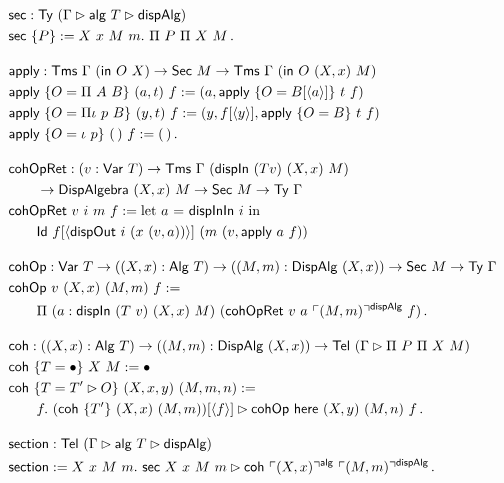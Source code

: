 \begin{fleqn}
\begin{align*}
&\mta{sec} : \Ty\ (\Gamma \rhd \mta{alg}\ T \rhd \mta{dispAlg})  \\
&\mta{sec}\ \{P\} := X\ x\ M\ m.\ \Pi\ P\ \Pi\ X\ M \,. \\[1em]
&\mta{apply} : \mta{Tms}\ \Gamma\ (\mta{in}\ O\ X) \to \mta{Sec}\ M \to \Tms\ \Gamma\ (\mta{in}\ O\ (X, x)\ M) \\
&\mta{apply}\ \{O = \Pi\ A\ B\}\ (a, t)\ f := (a, \mta{apply}\ \{O = B[\Msub a]\}\ t\ f) \\
&\mta{apply}\ \{O = \Pi\iota\ p\ B\}\ (y, t)\ f := (y, f[\Msub y], \mta{apply}\ \{O = B\}\ t\ f) \\
&\mta{apply}\ \{O = \iota\ p\}\ (\,)\ f := (\,) \,. \\[1em]
&\mta{cohOpRet} : (v : \mta{Var}\ T) \to \Tms\ \Gamma\ (\mta{dispIn}\ (T v)\ (X, x)\ M) \\ &\qquad \to \mta{DispAlgebra}\ (X, x)\ M \to \mta{Sec}\ M \to \Ty\ \Gamma \\
&\mta{cohOpRet}\ v\ i\ m\ f := \text{let $a$ = $\mta{dispInIn}\ i$ in } \\ & \qquad \mta{Id}\ f[\Msub{\mta{dispOut}\ i\ (x\ (v, a))}]\ (m\ (v, \mta{apply}\ a\ f)) \\[1em]
&\mta{cohOp} : \mta{Var}\ T \to ((X, x) : \mta{Alg}\ T) \to ((M, m) : \mta{DispAlg}\ (X, x)) \to \mta{Sec}\ M \to \Ty\ \Gamma \\
&\mta{cohOp}\ v\ (X, x)\ (M, m)\ f := \\ & \qquad \Pi\ (a : \mta{dispIn}\ (T\ v)\ (X, x)\ M)\ (\mta{cohOpRet}\ v\ a\ \emb{(M, m)}^{\mta{dispAlg}}\ f)\, . \\[1em]
&\mta{coh} : ((X, x) : \mta{Alg}\ T) \to ((M, m) : \mta{DispAlg}\ (X, x)) \to \Tel\ (\Gamma \rhd \Pi\ P\ \Pi\ X\ M) \\
&\mta{coh}\ \{T = \bullet\}\ X\ M := \bullet \\
&\mta{coh}\ \{T = T' \rhd O\}\ (X, x, y)\ (M, m, n) := \\ & \qquad f.\ (\mta{coh}\ \{T'\}\ (X, x)\ (M, m))[\Msub{f}] \rhd \mta{cohOp}\ \mta{here}\ (X, y)\ (M, n)\ f \,. \\[1em]
&\mta{section} : \Tel\ (\Gamma \rhd \mta{alg}\ T \rhd \mta{dispAlg}) \\
&\mta{section} := X\ x\ M\ m.\ \mta{sec}\ X\ x\ M\ m \rhd \mta{coh}\ \emb{(X, x)}^{\mta{alg}}\ \emb{(M, m)}^{\mta{dispAlg}} \,.
\end{align*}
\end{fleqn}

